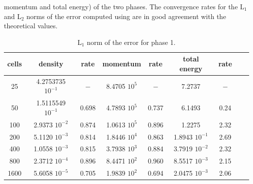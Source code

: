 \documentclass[preprint,10pt]{elsarticle}
\begin{document}
momentum and total energy) of the two phases. The convergence rates for the L$_1$ and L$_2$ norms of the error computed using  
are in good agreement with the theoretical values.
%
\begin{table}[H]
\begin{center}
 \caption{\label{tbl:l1-norm-indp-phase-1} L$_1$ norm of the error for phase 1.}
 \begin{tabular}{|c|c|c|c|c|c|c|c|c|}
 \hline
cells & density         & rate   & momentum        & rate    & total energy         & rate     \\ \hline
25      & 4.2753735 $10^{-1}$ & $-$    & 8.4705 $10^{5}$ & $-$     & 7.2737           & $-$      \\ \hline
50      & 1.5115549 $10^{-1}$ & 0.698 & 4.7893 $10^{5}$ & 0.737 & 6.1493           & 0.24 \\ \hline
100    & 2.9373 $10^{-2}$ & 0.874 & 1.0613 $10^{5}$ & 0.896  & 1.2275           & 2.32   \\ \hline
200    & 5.1120 $10^{-3}$ & 0.814 & 1.8446 $10^{4}$ & 0.863  & 1.8943 $10^{-1}$ & 2.69   \\ \hline
400    & 1.0558 $10^{-3}$ & 0.815 & 3.7938 $10^{3}$ & 0.884  & 3.7919 $10^{-2}$ & 2.32   \\ \hline
800    & 2.3712 $10^{-4}$ & 0.896 & 8.4471 $10^{2}$ & 0.960  & 8.5517 $10^{-3}$ & 2.15   \\ \hline
1600  & 5.6058 $10^{-5}$ & 0.705 & 1.9839 $10^{2}$ & 0.694  & 2.0475 $10^{-3}$ & 2.06   \\ \hline
\end{tabular}
\end{center}
\end{table}
%
\end{document}
